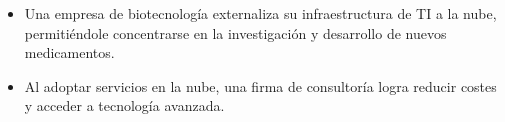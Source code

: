 \begin{solution}
	\begin{itemize}
		\item Una empresa de biotecnología externaliza su infraestructura de TI a la nube, permitiéndole concentrarse en la investigación y desarrollo de nuevos medicamentos.
		\item Al adoptar servicios en la nube, una firma de consultoría logra reducir costes y acceder a tecnología avanzada.
	\end{itemize}

\end{solution}

